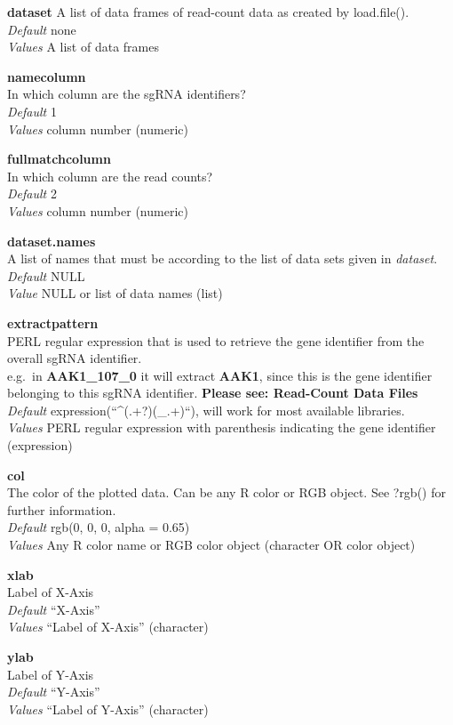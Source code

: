 \documentclass[]{article}
\begin{document}
\textbf{dataset} A list of data frames of read-count data as created by
load.file().\\
\emph{Default} none\\
\emph{Values} A list of data frames

\textbf{namecolumn}\\
In which column are the sgRNA identifiers?\\
\emph{Default} 1\\
\emph{Values} column number (numeric)

\textbf{fullmatchcolumn}\\
In which column are the read counts?\\
\emph{Default} 2\\
\emph{Values} column number (numeric)

\textbf{dataset.names}\\
A list of names that must be according to the list of data sets given in
\emph{dataset}.\\
\emph{Default} NULL\\
\emph{Value} NULL or list of data names (list)

\textbf{extractpattern}\\
PERL regular expression that is used to retrieve the gene identifier
from the overall sgRNA identifier.\\
e.g.~in \textbf{AAK1\_107\_0} it will extract \textbf{AAK1}, since this
is the gene identifier belonging to this sgRNA identifier.
\textbf{Please see: Read-Count Data Files}\\
\emph{Default} expression(``\^{}(.+?)(\_.+)``), will work for most
available libraries.\\
\emph{Values} PERL regular expression with parenthesis indicating the
gene identifier (expression)

\textbf{col}\\
The color of the plotted data. Can be any R color or RGB object. See
?rgb() for further information.\\
\emph{Default} rgb(0, 0, 0, alpha = 0.65)\\
\emph{Values} Any R color name or RGB color object (character OR color
object)

\textbf{xlab}\\
Label of X-Axis\\
\emph{Default} ``X-Axis''\\
\emph{Values} ``Label of X-Axis'' (character)

\textbf{ylab}\\
Label of Y-Axis\\
\emph{Default} ``Y-Axis''\\
\emph{Values} ``Label of Y-Axis'' (character)
\end{document}
